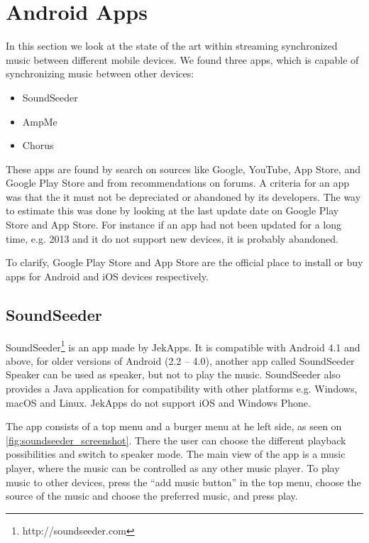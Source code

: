 \section{Android Apps}\label{sec:sota_apps}
In this section we look at the state of the art within streaming synchronized music between different mobile devices.
We found three apps, which is capable of synchronizing music between other devices:
\begin{itemize}
    \item SoundSeeder
    \item AmpMe
    \item Chorus
\end{itemize}

These apps are found by search on sources like Google, YouTube, App Store, and Google Play Store and from recommendations on forums. 
A criteria for an app was that the it must not be depreciated or abandoned by its developers.
The way to estimate this was done by looking at the last update date on Google Play Store and App Store.
For instance if an app had not been updated for a long time, e.g. 2013 and it do not support new devices, it is probably abandoned.

To clarify, Google Play Store and App Store are the official place to install or buy apps for Android and iOS devices respectively.

\subsection{SoundSeeder}\label{subsec:soundseeder}
SoundSeeder\footnote{http://soundseeder.com} is an app made by JekApps. 
It is compatible with Android 4.1 and above, for older versions of Android (2.2 -- 4.0),
another app called SoundSeeder Speaker can be used as speaker, but not to play the music.
SoundSeeder also provides a Java application for compatibility with other platforms e.g. Windows, macOS and Linux.
JekApps do not support iOS and Windows Phone\cite{soundseeder_ios}.

The app consists of a top menu and a burger menu at he left side, as seen on \cref{fig:soundseeder_screenshot}.
There the user can choose the different playback possibilities and switch to speaker mode.
The main view of the app is a music player, where the music can be controlled as any other music player. 
To play music to other devices, press the ``add music button'' in the top menu, choose the source of the music and choose the preferred music, and press play. 

